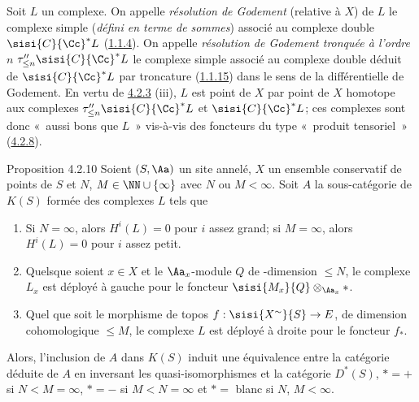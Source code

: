 \documentclass[10pt]{../fichiers-configuration-latex/smfart}
\begin{document}
\setcounter{subsubsection}{8}
\subsubsection{}

Soit $L$ un complexe. On appelle \emph{résolution de Godement}
(relative à $X$) de $L$ le complexe simple (\emph{défini en terme de
sommes}) associé au complexe double $\sisi{C}{\Cc}^{\ast}L$
(\hyperref[XVII.subsubsec1.1.4]{1.1.4}). On appelle \emph{résolution de Godement
tronquée à l'ordre} $n$ $\tau''_{\leq n}\sisi{C}{\Cc}^{\ast}L$ le complexe
simple associé au complexe double déduit de $\sisi{C}{\Cc}^{\ast}L$ par troncature
(\hyperref[XVII.subsubsec1.1.15]{1.1.15}) dans le sens de la différentielle de
Godement. En vertu de \hyperref[XVII.prop4.2.3]{4.2.3} (iii), $L$ est point de $X$ par point de
$X$ homotope aux complexes $\tau''_{\leq n} \sisi{C}{\Cc}^{\ast}L$ et $\sisi{C}{\Cc}^{\ast}L$;
ces complexes sont donc « aussi bons que $L$ » vis-à-vis des
foncteurs du type « produit tensoriel » (\hyperref[XVII.lem4.2.8]{4.2.8}).

\begin{enonce*}{Proposition 4.2.10}
Soient $(S,\Aa)$ un site annelé, $X$ un ensemble conservatif
de points de $S$ et $N$, $M\in \NN\cup \{\infty\}$ avec $N$ ou
$M<\infty$. Soit $A$ la sous-catégorie de $K(S)$ formée des complexes
$L$ tels que
\begin{enumerate}
\renewcommand{\theenumi}{\alph{enumi}}
\renewcommand{\labelenumi}{(\theenumi)}
\item Si $N=\infty$, alors $H^{i}(L)=0$ pour $i$ assez grand; si
$M=\infty$, alors $H^{i}(L)=0$ pour $i$ assez petit.

\item Quels\pageoriginale que soient $x\in X$ et le
$\Aa_x$-module $Q$ de \tTor-dimension $\leq N$, le complexe
$L_x$ est déployé à gauche pour le foncteur
$\sisi{M_x}{Q}\otimes_{\Aa_x}\ast$.

\item Quel que soit le morphisme de topos $f:\sisi{X^{\sim}}{S}\rightarrow E$,
de dimension cohomologique $\leq M$, le complexe $L$ est déployé à
droite pour le foncteur $f_{\ast}$.
\end{enumerate}

Alors, l'inclusion de $A$ dans $K(S)$ induit une équivalence entre la
catégorie déduite de $A$ en inversant les quasi-isomorphismes et la
catégorie $D^{\ast}(S)$, $\ast=+$ si $N<M=\infty$, $\ast=-$ si
$M<N=\infty$ et $\ast=$ blanc si $N$, $M<\infty$.
\end{enonce*}
\end{document}
